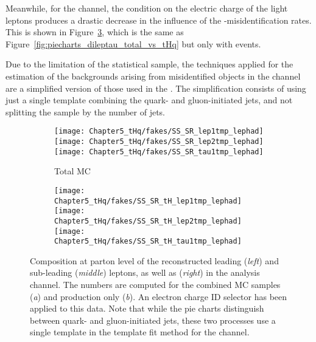 Meanwhile, for the \dilepSStau channel, the condition on the electric charge of the
light leptons produces a drastic decrease in the influence of the \tauhad-misidentification rates.
This is shown in Figure~\ref{fig:piecharts_dileptau_SS_total_vs_tHq}, which is the same
as Figure~\ref{fig:piecharts_dileptau_total_vs_tHq} but only with \dilepSStau events.

Due to the limitation of the statistical sample, the techniques applied for the estimation of the backgrounds 
arising from misidentified objects in the \dilepSStau channel are
a simplified version of those used in the \dilepOStau.
The simplification consists of using just a single template combining the quark- and gluon-initiated jets, and
not splitting the sample by the number of \btagged jets. 

 


\begin{figure}[h]
  \begin{subfigure}[b]{0.99\linewidth}
       \centering
       \texttt{[image: Chapter5\_tHq/fakes/SS\_SR\_lep1tmp\_lephad]}
       \texttt{[image: Chapter5\_tHq/fakes/SS\_SR\_lep2tmp\_lephad]}
       \texttt{[image: Chapter5\_tHq/fakes/SS\_SR\_tau1tmp\_lephad]}
       \caption{Total MC}
       \label{fig:piecharts_dileptau_SS_total_vs_tHq:tot}
  \end{subfigure}
  \begin{subfigure}[b]{0.99\linewidth}
      \centering
      \texttt{[image: Chapter5\_tHq/fakes/SS\_SR\_tH\_lep1tmp\_lephad]}
      \texttt{[image: Chapter5\_tHq/fakes/SS\_SR\_tH\_lep2tmp\_lephad]}
      \texttt{[image: Chapter5\_tHq/fakes/SS\_SR\_tH\_tau1tmp\_lephad]}
      \caption{\tHq}
      \label{fig:piecharts_dileptau_SS_total_vs_tHq:tHq}
  \end{subfigure}
   \caption{Composition at parton level of the reconstructed leading (\textit{left}) and sub-leading (\textit{middle}) leptons, as well as
   \tauhad (\textit{right}) in the \dilepSStau analysis channel. The numbers are computed for the combined
   MC samples (\textit{a}) and \tHq production only (\textit{b}). An electron charge ID selector has been applied to this data.
   Note that while the pie charts distinguish between quark- and gluon-initiated jets, these two processes use a single 
   template in the template fit method for the \dilepSStau channel.}
   \label{fig:piecharts_dileptau_SS_total_vs_tHq}
\end{figure}

